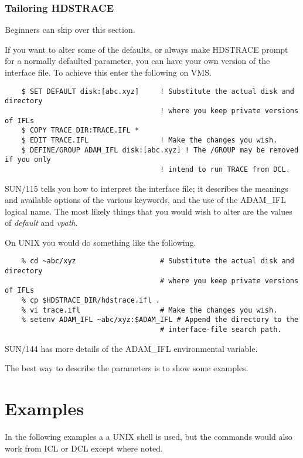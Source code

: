 \subsubsection{Tailoring HDSTRACE}

Beginners can skip over this section.

If you want to alter some of the defaults, or always make
{\footnotesize HDSTRACE} prompt for a normally defaulted parameter,
you can have your own version of the interface file.
To achieve this enter the following on VMS.

\small
\begin{verbatim}
    $ SET DEFAULT disk:[abc.xyz]     ! Substitute the actual disk and directory
                                     ! where you keep private versions of IFLs
    $ COPY TRACE_DIR:TRACE.IFL *
    $ EDIT TRACE.IFL                 ! Make the changes you wish.
    $ DEFINE/GROUP ADAM_IFL disk:[abc.xyz] ! The /GROUP may be removed if you only
                                     ! intend to run TRACE from DCL.
\end{verbatim}
\normalsize
SUN/115 tells you how to interpret the interface file; it describes
the meanings and available options of the various keywords, and the use
of the ADAM\_IFL logical name.  The most likely things that you would
wish to alter are the values of {\em default\/} and {\em vpath}. 

On UNIX you would do something like the following.
\small
\begin{verbatim}
    % cd ~abc/xyz                    # Substitute the actual disk and directory
                                     # where you keep private versions of IFLs
    % cp $HDSTRACE_DIR/hdstrace.ifl .
    % vi trace.ifl                   # Make the changes you wish.
    % setenv ADAM_IFL ~abc/xyz:$ADAM_IFL # Append the directory to the 
                                     # interface-file search path.
\end{verbatim}
\normalsize
SUN/144 has more details of the ADAM\_IFL environmental variable.
\bigskip

The best way to describe the parameters is to show some examples.

\section{Examples}
\label{se:example}
In the following examples a a UNIX shell is used, but the commands would
also work from ICL or DCL except where noted. 

